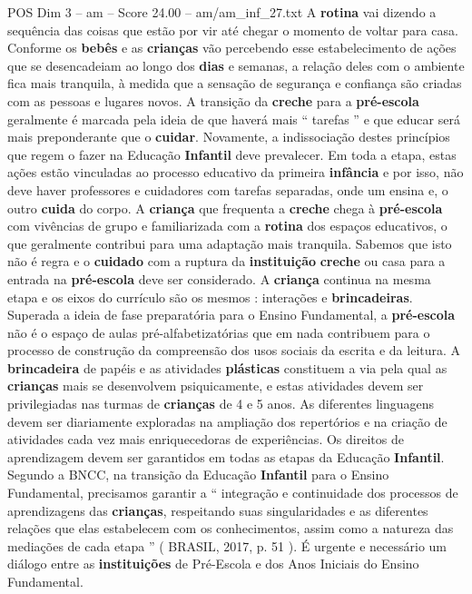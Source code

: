 \begin{textsample}{POS Dim 3 – am – Score 24.00 – am/am\_inf\_27.txt}
A \textbf{rotina} vai dizendo a sequência das coisas que estão por vir até chegar o momento de voltar para casa.
Conforme os \textbf{bebês} e as \textbf{crianças} vão percebendo esse estabelecimento de ações que se desencadeiam ao longo dos \textbf{dias} e semanas, a relação deles com o ambiente fica mais tranquila, à medida que a sensação de segurança e confiança são criadas com as pessoas e lugares novos.
A transição da \textbf{creche} para a \textbf{pré-escola} geralmente é marcada pela ideia de que haverá mais “ tarefas ” e que educar será mais preponderante que o \textbf{cuidar}.
Novamente, a indissociação destes princípios que regem o fazer na Educação \textbf{Infantil} deve prevalecer.
Em toda a etapa, estas ações estão vinculadas ao processo educativo da primeira \textbf{infância} e por isso, não deve haver professores e cuidadores com tarefas separadas, onde um ensina e, o outro \textbf{cuida} do corpo.
A \textbf{criança} que frequenta a \textbf{creche} chega à \textbf{pré-escola} com vivências de grupo e familiarizada com a \textbf{rotina} dos espaços educativos, o que geralmente contribui para uma adaptação mais tranquila.
Sabemos que isto não é regra e o \textbf{cuidado} com a ruptura da \textbf{instituição} \textbf{creche} ou casa para a entrada na \textbf{pré-escola} deve ser considerado.
A \textbf{criança} continua na mesma etapa e os eixos do currículo são os mesmos : interações e \textbf{brincadeiras}.
Superada a ideia de fase preparatória para o Ensino Fundamental, a \textbf{pré-escola} não é o espaço de aulas pré-alfabetizatórias que em nada contribuem para o processo de construção da compreensão dos usos sociais da escrita e da leitura.
A \textbf{brincadeira} de papéis e as atividades \textbf{plásticas} constituem a via pela qual as \textbf{crianças} mais se desenvolvem psiquicamente, e estas atividades devem ser privilegiadas nas turmas de \textbf{crianças} de 4 e 5 anos.
As diferentes linguagens devem ser diariamente exploradas na ampliação dos repertórios e na criação de atividades cada vez mais enriquecedoras de experiências.
Os direitos de aprendizagem devem ser garantidos em todas as etapas da Educação \textbf{Infantil}.
Segundo a BNCC, na transição da Educação \textbf{Infantil} para o Ensino Fundamental, precisamos garantir a “ integração e continuidade dos processos de aprendizagens das \textbf{crianças}, respeitando suas singularidades e as diferentes relações que elas estabelecem com os conhecimentos, assim como a natureza das mediações de cada etapa ” ( BRASIL, 2017, p. 51 ).
É urgente e necessário um diálogo entre as \textbf{instituições} de Pré-Escola e dos Anos Iniciais do Ensino Fundamental.

\end{textsample}
